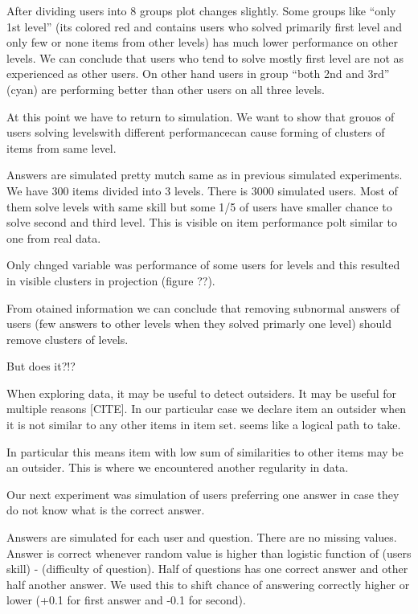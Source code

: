\documentclass[
  digital, %
  table,   %
  nolof,     %
  nolot,     %
  nocover
]{fithesis3}
\begin{document}
After dividing users into 8 groups plot changes slightly. Some groups
like ``only 1st level'' (its colored red and contains users who solved
primarily first level and only few or none items from other levels) has
much lower performance on other levels. We can conclude that users who
tend to solve mostly first level are not as experienced as other users. On
other hand users in group ``both 2nd and 3rd'' (cyan) are performing
better than other users on all three levels.

At this point we have to return to simulation. We want to show that
grouos of users solving levelswith different performancecan cause
forming of clusters of items from same level.

Answers are simulated pretty mutch same as in previous simulated
experiments. We have 300 items divided into 3 levels. There is 3000
simulated users. Most of them solve levels with same skill but some 1/5
of users have smaller chance to solve second and third level. This is
visible on item performance polt similar to one from real data.

Only chnged variable was performance of some users for levels and this
resulted in visible clusters in projection (figure ??).

From otained information we can conclude that removing subnormal answers
of users (few answers to other levels when they solved primarly one
level) should remove clusters of levels.

But does it?!?




When exploring data, it may be useful to detect outsiders. It may be
useful for multiple reasons [CITE]. In our particular case we
declare item an outsider when it is not similar to any other items in
item set. seems like a logical path to take.

In particular this means item with low sum of similarities to other
items may be an outsider. This is where we encountered another
regularity in data.


Our next experiment was simulation of users preferring one answer in
case they do not know what is the correct answer.

Answers are simulated for each user and question. There are no missing
values. Answer is correct whenever random value is higher than logistic
function of (users skill) - (difficulty of question). Half of questions
has one correct answer and other half another answer. We used this to
shift chance of answering correctly higher or lower (+0.1 for first
answer and -0.1 for second).
\end{document}

